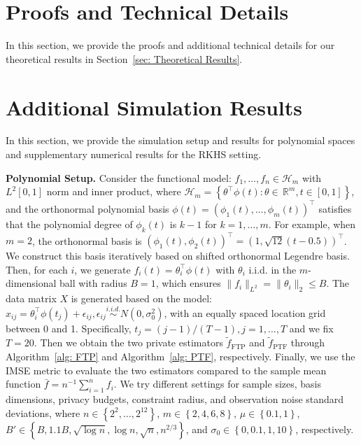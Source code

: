 \documentclass[twoside,11pt]{article}
\newcommand\R{\,{\mathbb{R}}}   %
\newcommand{\Set}[1]{\left\{{#1}\right\}} %
\begin{document}
\section{Proofs and Technical Details}
In this section, we provide the proofs and additional technical details for our theoretical results in Section~\ref{sec: Theoretical Results}.






\section{Additional Simulation Results}
\label{sec: Additional Simulation Results}
In this section, we provide the simulation setup and results for polynomial spaces and supplementary numerical results for the RKHS setting. 

\textbf{Polynomial Setup.} Consider the functional model: $f_1,\ldots,f_n\in \mathcal{H}_m$ with $L^2[0,1]$ norm and inner product, where $\mathcal{H}_m=\Set{\theta^\top \phi(t):\theta\in \R^m, t\in [0,1]}$, and the orthonormal polynomial basis $\phi(t) = (\phi_1(t),\ldots,\phi_m(t))^\top$ satisfies that the polynomial degree of $\phi_k(t)$ is $k-1$ for $k=1,\ldots,m$. For example, when $m=2$, the orthonormal basis is $(\phi_1(t),\phi_2(t))^\top = (1,\sqrt{12}(t-0.5))^\top$. We construct this basis iteratively based on shifted orthonormal Legendre basis. Then, for each $i$, we generate $f_i(t) = \theta_i^\top \phi(t)$ with $\theta_i$ i.i.d. in the $m$-dimensional ball with radius $B=1$, which ensures $\|f_i\|_{L^2} = \|\theta_i\|_2\leq B$. The data matrix $X$ is generated based on the model: $x_{ij} = \theta_i^\top \phi(t_j) + \epsilon_{ij}, \epsilon_{ij}\overset{i.i.d.}{\sim} N(0,\sigma_0^2)$, with an equally spaced location grid between 0 and 1. Specifically, $t_j = (j-1)/(T-1), j=1,\ldots,T$ and we fix $T=20$. Then we obtain the two private estimators $\widetilde{f}_\mathrm{FTP}$ and $\widetilde{f}_\mathrm{PTF}$ through Algorithm~\ref{alg: FTP} and Algorithm~\ref{alg: PTF}, respectively. Finally, we use the IMSE metric to evaluate the two estimators compared to the sample mean function $\bar{f} = n^{-1}\sum_{i=1}^n f_i$. We try different settings for sample sizes, basis dimensions, privacy budgets, constraint radius, and observation noise standard deviations, where $n\in \Set{2^2, \ldots, 2^{12}}$, $m\in \Set{2,4,6,8}$, $\mu\in \Set{0.1, 1}$, $B'\in\Set{B, 1.1B, \sqrt{\log n}, \log n, \sqrt{n}, n^{2/3}}$, and $\sigma_0\in\Set{0, 0.1, 1, 10}$, respectively. 
\end{document}
